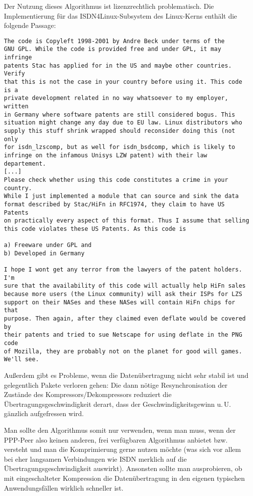 \begin{description}
Der Nutzung dieses Algorithmus ist lizenzrechtlich problematisch. Die
Implementierung für das ISDN4Linux-Subsystem des Linux-Kerns enthält die
folgende Passage:

\begin{verbatim}
The code is Copyleft 1998-2001 by Andre Beck under terms of the
GNU GPL. While the code is provided free and under GPL, it may infringe
patents Stac has applied for in the US and maybe other countries. Verify
that this is not the case in your country before using it. This code is a
private development related in no way whatsoever to my employer, written
in Germany where software patents are still considered bogus. This
situation might change any day due to EU law. Linux distributors who
supply this stuff shrink wrapped should reconsider doing this (not only
for isdn_lzscomp, but as well for isdn_bsdcomp, which is likely to
infringe on the infamous Unisys LZW patent) with their law departement.
[...]
Please check whether using this code constitutes a crime in your country.
While I just implemented a module that can source and sink the data
format described by Stac/HiFn in RFC1974, they claim to have US Patents
on practically every aspect of this format. Thus I assume that selling
this code violates these US Patents. As this code is

a) Freeware under GPL and
b) Developed in Germany

I hope I wont get any terror from the lawyers of the patent holders. I'm
sure that the availability of this code will actually help HiFn sales
because more users (the Linux community) will ask their ISPs for LZS
support on their NASes and these NASes will contain HiFn chips for that
purpose. Then again, after they claimed even deflate would be covered by
their patents and tried to sue Netscape for using deflate in the PNG code
of Mozilla, they are probably not on the planet for good will games.
We'll see.
\end{verbatim}

Außerdem gibt es Probleme, wenn die Datenübertragung nicht sehr stabil ist
und gelegentlich Pakete verloren gehen: Die dann nötige Resynchronisation der
Zustände des Kompressors/Dekompressors reduziert die
Übertragungsgeschwindigkeit derart, dass der Geschwindigkeitsgewinn u.\,U.
gänzlich aufgefressen wird.

Man sollte den Algorithmus somit nur verwenden, wenn man muss, wenn der
PPP-Peer also keinen anderen, frei verfügbaren Algorithmus anbietet bzw.
versteht und man die Komprimierung gerne nutzen möchte (was sich vor allem bei
eher langsamen Verbindungen wie ISDN merklich auf die Übertragungsgeschwindigkeit
auswirkt). Ansonsten sollte man ausprobieren, ob mit eingeschalteter Kompression
die Datenübertragung in den eigenen typischen Anwendungsfällen wirklich
schneller ist.


\end{description}
